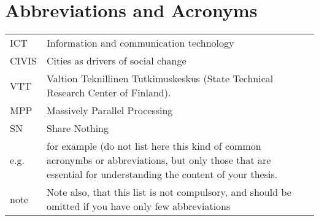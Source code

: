 \chapter*{Abbreviations and Acronyms}


\noindent
\begin{longtable}{@{}p{}p{}@{}}
ICT & Information and communication technology \\
CIVIS & Cities as drivers of social change \\ 
VTT & Valtion Teknillinen Tutkimuskeskus (State Technical Research Center of Finland). \\ 
MPP  & Massively Parallel Processing \\
SN & Share Nothing \\ 
e.g. & for example (do not list here this kind of common acronymbs or abbreviations, but only those that are essential for understanding the content of your thesis. \\ 
note & Note also, that this list is not compulsory, and should be omitted if you have only few abbreviations

\end{longtable}
